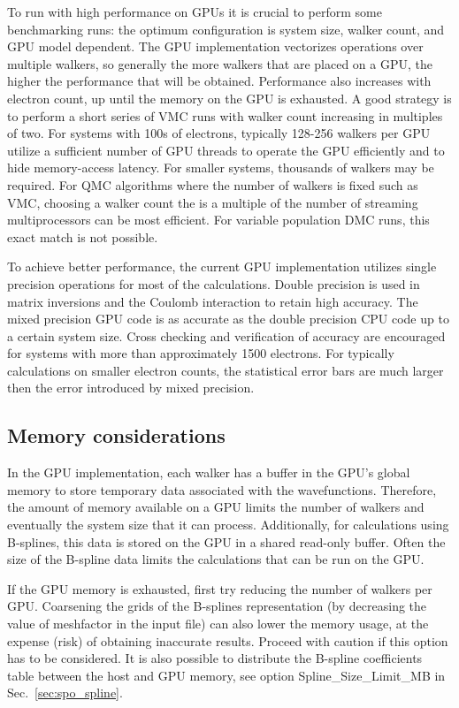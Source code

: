 To run with high performance on GPUs it is crucial to perform some
benchmarking runs: the optimum configuration is system size, walker
count, and GPU model dependent. The GPU implementation vectorizes
operations over multiple walkers, so generally the more walkers that
are placed on a GPU, the higher the performance that will be
obtained. Performance also increases with electron count, up until the
memory on the GPU is exhausted. A good strategy is to perform a short
series of VMC runs with walker count increasing in multiples of
two. For systems with 100s of electrons, typically 128-256 walkers per
GPU utilize a sufficient number of GPU threads to operate the GPU
efficiently and to hide memory-access latency. For smaller systems,
thousands of walkers may be required. For QMC algorithms where the number of
walkers is fixed such as VMC, choosing a walker count the is a multiple of the
number of streaming multiprocessors can be most efficient. For
variable population DMC runs, this exact match is not possible.

To achieve better performance, the current GPU implementation utilizes
single precision operations for most of the calculations. Double
precision is used in matrix inversions and the Coulomb interaction to
retain high accuracy. The mixed precision GPU code is as accurate as
the double precision CPU code up to a certain system size. Cross
checking and verification of accuracy are encouraged for systems with
more than approximately 1500 electrons. For typically calculations on
smaller electron counts, the statistical error bars are much larger
then the error introduced by mixed precision.


\subsection{Memory considerations}

In the GPU implementation, each walker has a buffer in the GPU's
global memory to store temporary data associated with the
wavefunctions. Therefore, the amount of memory available on a GPU
limits the number of walkers and eventually the system size that it
can process. Additionally, for calculations using B-splines, this data
is stored on the GPU in a shared read-only buffer. Often the size of the
B-spline data limits the calculations that can be run on the GPU.

If the GPU memory is exhausted, first try reducing the number of walkers per GPU.
Coarsening the grids of the B-splines representation (by decreasing
the value of meshfactor in the input file) can also lower the memory
usage, at the expense (risk) of obtaining inaccurate results. Proceed
with caution if this option has to be considered.  It is also possible
to distribute the B-spline coefficients table between the host and GPU
memory, see option Spline\_Size\_Limit\_MB in
Sec.~\ref{sec:spo_spline}.
